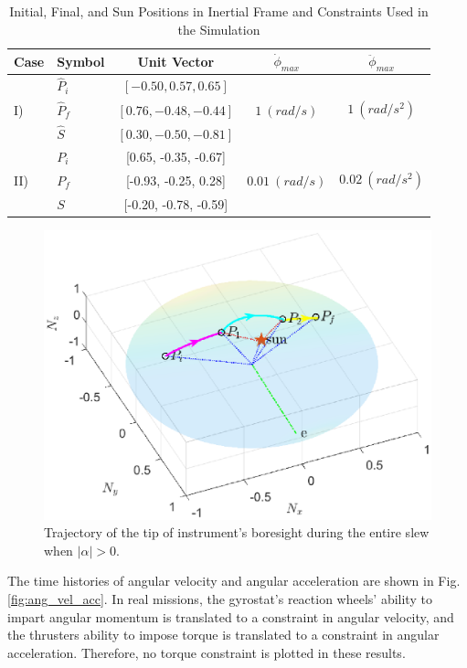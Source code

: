 \documentclass[journal ]{new-aiaa}
\begin{document}
\begin{table}[hbt!]
\centering
\caption{Initial, Final, and Sun Positions in Inertial Frame and Constraints Used in the Simulation}
\begin{tabular}{llccc}
\hline
Case&Symbol& Unit Vector & $\dot{\phi}_{max}$&$\ddot{\phi}_{max}$ \\
\hline
&$\hat{P}_i$ & $[-0.50, 0.57, 0.65]$& & \\
I)& $\hat{P}_f$ & $[0.76, -0.48, -0.44]$& $1\ (rad/s)$& $1\ (rad/s^2)$\\ 
&$\hat{S}$ & $[0.30, -0.50, -0.81]$& & \\
\hline
&$P_i$ & [0.65, -0.35, -0.67] & &\\
II)&$P_f$ & [-0.93, -0.25, 0.28] & $0.01\ (rad/s)$& $0.02\ (rad/s^2)$\\ 
&$S$ & [-0.20, -0.78, -0.59] & &\\
\hline
\end{tabular}
\label{tab:alphaNot0_PiPfS_AWmax}%
\end{table}
	\begin{figure}[hbt!]
	\centering
		\includegraphics[width=4.75in]{figures/alphaNot0/phi1_phi2_phi3.eps}
		\caption{Trajectory of the tip of instrument's boresight during the entire slew when $|\alpha|>0$.}
		\label{fig:phi1_phi2_phi3}
\end{figure}	
The time histories of angular velocity and angular acceleration are shown in Fig. \ref{fig:ang_vel_acc}. In real missions, the gyrostat's reaction wheels' ability to impart angular momentum is translated to a constraint in angular velocity, and the thrusters ability to impose torque is translated to a constraint in angular acceleration. Therefore, no torque constraint is plotted in these results.
\end{document}
